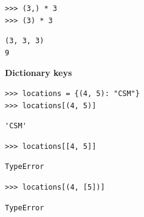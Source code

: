 \begin{blocksection}
\begin{lstlisting}
>>> (3,) * 3
>>> (3) * 3
\end{lstlisting}
\begin{solution}[.45in]
\begin{lstlisting}
(3, 3, 3)
9
\end{lstlisting}
\end{solution}
\end{blocksection}


\begin{blocksection}
\textbf{Dictionary keys}
\begin{lstlisting}
>>> locations = {(4, 5): "CSM"}
>>> locations[(4, 5)]
\end{lstlisting}
\begin{solution}[.3in]
\begin{lstlisting}
'CSM'
\end{lstlisting}
\end{solution}
\end{blocksection}

\begin{blocksection}
\begin{lstlisting}
>>> locations[[4, 5]]
\end{lstlisting}
\begin{solution}[.3in]
\begin{lstlisting}
TypeError
\end{lstlisting}
\end{solution}
\end{blocksection}

\begin{blocksection}
\begin{lstlisting}
>>> locations[(4, [5])]
\end{lstlisting}
\begin{solution}[.3in]
\begin{lstlisting}
TypeError
\end{lstlisting}
\end{solution}
\end{blocksection}

